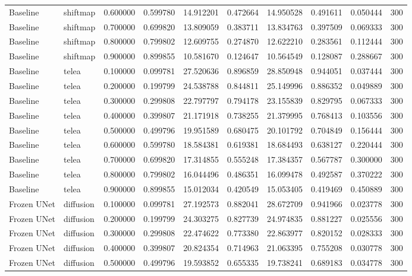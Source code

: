 \begin{table}[h]
\begin{tabular}{llrrrrrrrr}
Baseline & shiftmap & 0.600000 & 0.599780 & 14.912201 & 0.472664 & 14.950528 & 0.491611 & 0.050444 & 300 \\
Baseline & shiftmap & 0.700000 & 0.699820 & 13.809059 & 0.383711 & 13.834763 & 0.397509 & 0.069333 & 300 \\
Baseline & shiftmap & 0.800000 & 0.799802 & 12.609755 & 0.274870 & 12.622210 & 0.283561 & 0.112444 & 300 \\
Baseline & shiftmap & 0.900000 & 0.899855 & 10.581670 & 0.124647 & 10.564549 & 0.128087 & 0.288667 & 300 \\
Baseline & telea & 0.100000 & 0.099781 & 27.520636 & 0.896859 & 28.850948 & 0.944051 & 0.037444 & 300 \\
Baseline & telea & 0.200000 & 0.199799 & 24.538788 & 0.844811 & 25.149996 & 0.886352 & 0.049889 & 300 \\
Baseline & telea & 0.300000 & 0.299808 & 22.797797 & 0.794178 & 23.155839 & 0.829795 & 0.067333 & 300 \\
Baseline & telea & 0.400000 & 0.399807 & 21.171918 & 0.738255 & 21.379995 & 0.768413 & 0.103556 & 300 \\
Baseline & telea & 0.500000 & 0.499796 & 19.951589 & 0.680475 & 20.101792 & 0.704849 & 0.156444 & 300 \\
Baseline & telea & 0.600000 & 0.599780 & 18.584381 & 0.619381 & 18.684493 & 0.638127 & 0.220444 & 300 \\
Baseline & telea & 0.700000 & 0.699820 & 17.314855 & 0.555248 & 17.384357 & 0.567787 & 0.300000 & 300 \\
Baseline & telea & 0.800000 & 0.799802 & 16.044496 & 0.486351 & 16.099478 & 0.492587 & 0.370222 & 300 \\
Baseline & telea & 0.900000 & 0.899855 & 15.012034 & 0.420549 & 15.053405 & 0.419469 & 0.450889 & 300 \\
Frozen UNet & diffusion & 0.100000 & 0.099781 & 27.192573 & 0.882041 & 28.672709 & 0.941966 & 0.023778 & 300 \\
Frozen UNet & diffusion & 0.200000 & 0.199799 & 24.303275 & 0.827739 & 24.974835 & 0.881227 & 0.025556 & 300 \\
Frozen UNet & diffusion & 0.300000 & 0.299808 & 22.474622 & 0.773380 & 22.863977 & 0.820152 & 0.028333 & 300 \\
Frozen UNet & diffusion & 0.400000 & 0.399807 & 20.824354 & 0.714963 & 21.063395 & 0.755208 & 0.030778 & 300 \\
Frozen UNet & diffusion & 0.500000 & 0.499796 & 19.593852 & 0.655335 & 19.738241 & 0.689183 & 0.034778 & 300 \\

\end{tabular}
\end{table}
